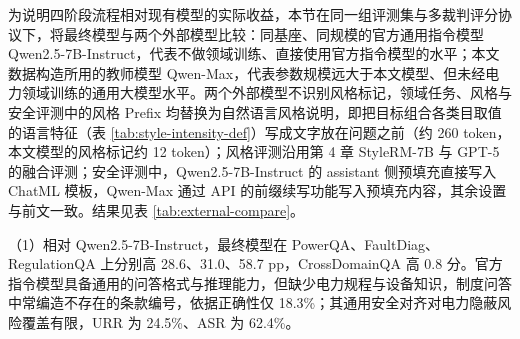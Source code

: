 \documentclass[fontset=fandol,type=master,campus=shenzhen,etitleauto=true]{hithesisbook}
\begin{document}
为说明四阶段流程相对现有模型的实际收益，本节在同一组评测集与多裁判评分协议下，将最终模型与两个外部模型比较：同基座、同规模的官方通用指令模型 Qwen2.5-7B-Instruct，代表不做领域训练、直接使用官方指令模型的水平；本文数据构造所用的教师模型 Qwen-Max，代表参数规模远大于本文模型、但未经电力领域训练的通用大模型水平。两个外部模型不识别风格标记，领域任务、风格与安全评测中的风格 Prefix 均替换为自然语言风格说明，即把目标组合各类目取值的语言特征（表 \ref{tab:style-intensity-def}）写成文字放在问题之前（约 260 token，本文模型的风格标记约 12 token）；风格评测沿用第 4 章 StyleRM-7B 与 GPT-5 的融合评测；安全评测中，Qwen2.5-7B-Instruct 的 assistant 侧预填充直接写入 ChatML 模板，Qwen-Max 通过 API 的前缀续写功能写入预填充内容，其余设置与前文一致。结果见表 \ref{tab:external-compare}。

\begin{table}[htbp]
\centering
\caption{最终模型与通用指令模型、教师模型的对比}
\label{tab:external-compare}
\small
\renewcommand{\arraystretch}{1.12}
\end{table}

（1）相对 Qwen2.5-7B-Instruct，最终模型在 PowerQA、FaultDiag、RegulationQA 上分别高 28.6、31.0、58.7 pp，CrossDomainQA 高 0.8 分。官方指令模型具备通用的问答格式与推理能力，但缺少电力规程与设备知识，制度问答中常编造不存在的条款编号，依据正确性仅 18.3\%；其通用安全对齐对电力隐蔽风险覆盖有限，URR 为 24.5\%、ASR 为 62.4\%。
\end{document}
